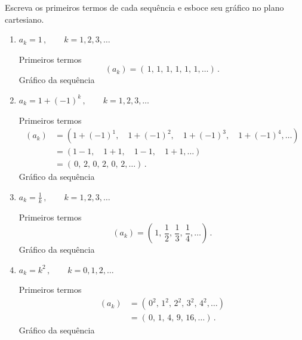 \begin{example}
  Escreva os primeiros termos de cada sequência e esboce seu gráfico
  no plano cartesiano.
	\solution
  \begin{enumerate}

  \item \( a_k = 1 \,, \qquad k = 1, 2, 3, \dots \) \par
    Primeiros termos
    \[
      (a_k) = \left(\, 1, \, 1, \, 1, \, 1, \, 1, \, 1, \dots \right) \,.
    \]
    Gráfico da sequência
    \begin{flushleft}
      
    \end{flushleft}

  \item \( a_k = 1+(-1)^k \,, \qquad k = 1, 2, 3, \dots \) \par
    Primeiros termos
    \begin{align*}
      (a_k)
        & = \left( 1+(-1)^1, \quad
                   1+(-1)^2, \quad
                   1+(-1)^3, \quad
                   1+(-1)^4, \dots \right) \\
        & = \left( 1-1, \quad
                   1+1, \quad
                   1-1, \quad
                   1+1, \dots \right) \\
        & = \left(\, 0, \, 2, \, 0, \, 2, \, 0, \, 2, \dots \right) \,.
    \end{align*}
    Gráfico da sequência
    \begin{flushleft}
      
    \end{flushleft}

  \item \( a_k = \frac{1}{k} \,, \qquad k = 1, 2, 3, \dots \) \par
    Primeiros termos
    \[
      (a_k) = \left(\, 1, \,
                       \frac{1}{2}, \,
                       \frac{1}{3}, \,
                       \frac{1}{4}, \dots \right) \,.
    \]
    Gráfico da sequência
    \begin{flushleft}
      
    \end{flushleft}

  \item \( a_k = k^2 \,, \qquad k = 0, 1, 2, \dots \) \par
    Primeiros termos
    \begin{align*}
      (a_k)
        & = \left(\, 0^2, \, 1^2, \, 2^2, \, 3^2, \, 4^2, \dots \right) \\
        & = \left(\, 0,   \, 1,   \, 4,   \, 9,   \, 16,  \dots \right) \,.
    \end{align*}
    Gráfico da sequência
    \begin{flushleft}
      
    \end{flushleft}


\end{enumerate}
\end{example}

